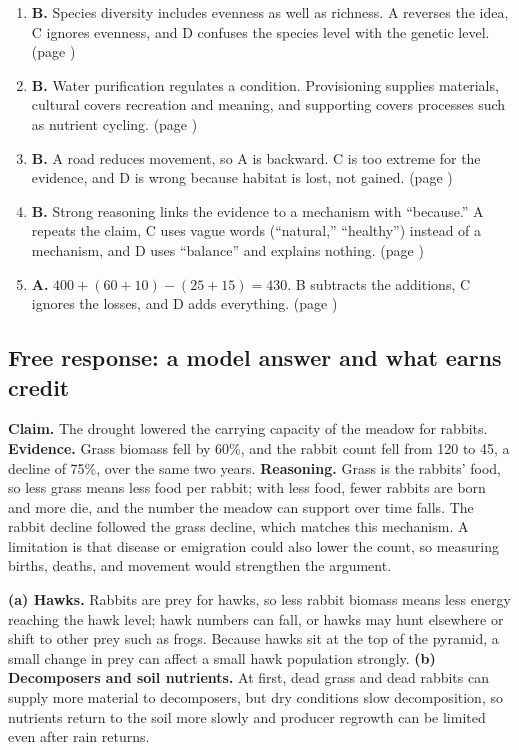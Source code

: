\documentclass[11pt,letterpaper]{article}
\begin{document}
\begin{enumerate}[itemsep=3pt]
\item \textbf{B.} Species diversity includes evenness as well as richness. A reverses the idea, C ignores evenness, and D confuses the species level with the genetic level. (page \pageref{diversity})
\item \textbf{B.} Water purification regulates a condition. Provisioning supplies materials, cultural covers recreation and meaning, and supporting covers processes such as nutrient cycling. (page \pageref{twoa})
\item \textbf{B.} A road reduces movement, so A is backward. C is too extreme for the evidence, and D is wrong because habitat is lost, not gained. (page \pageref{twob})
\item \textbf{B.} Strong reasoning links the evidence to a mechanism with ``because.'' A repeats the claim, C uses vague words (``natural,'' ``healthy'') instead of a mechanism, and D uses ``balance'' and explains nothing. (page \pageref{cer})
\item \textbf{A.} $400+(60+10)-(25+15)=430$. B subtracts the additions, C ignores the losses, and D adds everything. (page \pageref{twoc})
\end{enumerate}
\subsection*{Free response: a model answer and what earns credit}
\textbf{Claim.} The drought lowered the carrying capacity of the meadow for rabbits. \textbf{Evidence.} Grass biomass fell by 60\%, and the rabbit count fell from 120 to 45, a decline of 75\%, over the same two years. \textbf{Reasoning.} Grass is the rabbits' food, so less grass means less food per rabbit; with less food, fewer rabbits are born and more die, and the number the meadow can support over time falls. The rabbit decline followed the grass decline, which matches this mechanism. A limitation is that disease or emigration could also lower the count, so measuring births, deaths, and movement would strengthen the argument.

\textbf{(a) Hawks.} Rabbits are prey for hawks, so less rabbit biomass means less energy reaching the hawk level; hawk numbers can fall, or hawks may hunt elsewhere or shift to other prey such as frogs. Because hawks sit at the top of the pyramid, a small change in prey can affect a small hawk population strongly. \textbf{(b) Decomposers and soil nutrients.} At first, dead grass and dead rabbits can supply more material to decomposers, but dry conditions slow decomposition, so nutrients return to the soil more slowly and producer regrowth can be limited even after rain returns.
\end{document}
